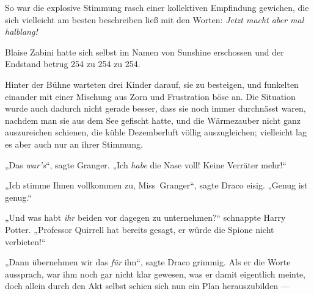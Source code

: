 So war die explosive Stimmung rasch einer kollektiven Empfindung gewichen, die sich vielleicht am besten beschreiben ließ mit den Worten: \emph{Jetzt macht aber mal halblang!}

Blaise Zabini hatte sich selbst im Namen von Sunshine erschossen und der Endstand betrug 254 zu 254 zu 254.

\later

Hinter der Bühne warteten drei Kinder darauf, sie zu besteigen, und funkelten einander mit einer Mischung aus Zorn und Frustration böse an. Die Situation wurde auch dadurch nicht gerade besser, dass sie noch immer durchnässt waren, nachdem man sie aus dem See gefischt hatte, und die Wärmezauber nicht ganz auszureichen schienen, die kühle Dezemberluft völlig auszugleichen; vielleicht lag es aber auch nur an ihrer Stimmung.

„Das \emph{war’s}“, sagte Granger.
„Ich \emph{habe} die Nase voll! Keine Verräter mehr!“

„Ich stimme Ihnen vollkommen zu, Miss~Granger“, sagte Draco eisig.
„Genug ist genug.“

„Und was habt \emph{ihr} beiden vor dagegen zu unternehmen?“ schnappte Harry Potter.
„Professor Quirrell hat bereits gesagt, er würde die Spione nicht verbieten!“

„Dann übernehmen wir das \emph{für} ihn“, sagte Draco grimmig. Als er die Worte aussprach, war ihm noch gar nicht klar gewesen, was er damit eigentlich meinte, doch allein durch den Akt selbst schien sich nun ein Plan herauszubilden —

